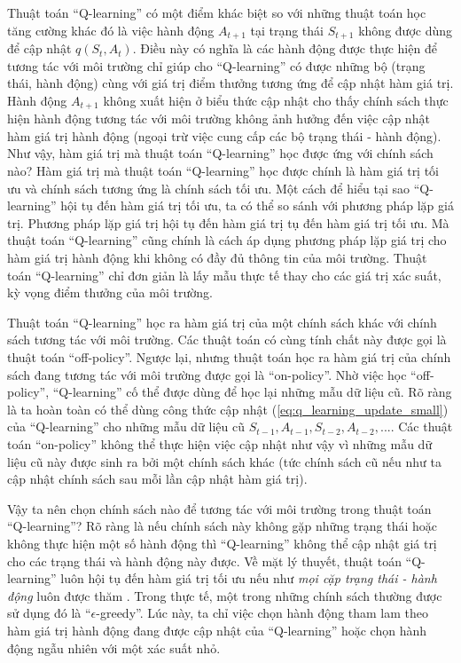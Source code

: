 Thuật toán ``Q-learning'' có một điểm khác biệt so với những thuật toán học tăng cường khác đó là việc hành động $A_{t+1}$ tại trạng thái $S_{t+1}$ không được dùng để cập nhật $q(S_t, A_t)$.
Điều này có nghĩa là các hành động được thực hiện để tương tác với môi trường chỉ giúp cho ``Q-learning'' có được những bộ (trạng thái, hành động) cùng với giá trị điểm thưởng tương ứng để cập nhật hàm giá trị.
Hành động $A_{t+1}$ không xuất hiện ở biểu thức cập nhật cho thấy chính sách thực hiện hành động tương tác với môi trường không ảnh hưởng đến việc cập nhật hàm giá trị hành động (ngoại trừ việc cung cấp các bộ trạng thái - hành động).
Như vậy, hàm giá trị mà thuật toán ``Q-learning'' học được ứng với chính sách nào?
Hàm giá trị mà thuật toán ``Q-learning'' học được chính là hàm giá trị tối ưu và chính sách tương ứng là chính sách tối ưu.
Một cách để hiểu tại sao ``Q-learning'' hội tụ đến hàm giá trị tối ưu, ta có thể so sánh với phương pháp lặp giá trị.
Phương pháp lặp giá trị hội tụ đến hàm giá trị tụ đến hàm giá trị tối ưu.
Mà thuật toán ``Q-learning'' cũng chính là cách áp dụng phương pháp lặp giá trị cho hàm giá trị hành động khi không có đầy đủ thông tin của môi trường.
Thuật toán ``Q-learning'' chỉ đơn giản là lấy mẫu thực tế thay cho các giá trị xác suất, kỳ vọng điểm thưởng của môi trường.

Thuật toán ``Q-learning'' học ra hàm giá trị của một chính sách khác với chính sách tương tác với môi trường.
Các thuật toán có cùng tính chất này được gọi là thuật toán ``off-policy''.
Ngược lại, nhưng thuật toán học ra hàm giá trị của chính sách đang tương tác với môi trường được gọi là ``on-policy''.
Nhờ việc học ``off-policy'', ``Q-learning'' cố thể được dùng để học lại những mẫu dữ liệu cũ.
Rõ ràng là ta hoàn toàn có thể dùng công thức cập nhật (\ref{eq:q_learning_update_small}) của ``Q-learning'' cho những mẫu dữ liệu cũ $S_{t-1}, A_{t-1}, S_{t-2}, A_{t-2}, ...$.
Các thuật toán ``on-policy'' không thể thực hiện việc cập nhật như vậy vì những mẫu dữ liệu cũ này được sinh ra bởi một chính sách khác (tức chính sách cũ nếu như ta cập nhật chính sách sau mỗi lần cập nhật hàm giá trị).

Vậy ta nên chọn chính sách nào để tương tác với môi trường trong thuật toán ``Q-learning''?
Rõ ràng là nếu chính sách này không gặp những trạng thái hoặc không thực hiện một số hành động thì ``Q-learning'' không thể cập nhật giá trị cho các trạng thái và hành động này được.
Về mặt lý thuyết, thuật toán ``Q-learning'' luôn hội tụ đến hàm giá trị tối ưu nếu như \textit{mọi cặp trạng thái - hành động} luôn được thăm \cite{sutton1998introduction}.
Trong thực tế, một trong những chính sách thường được sử dụng đó là ``$\epsilon$-greedy''.
Lúc này, ta chỉ việc chọn hành động tham lam theo hàm giá trị hành động đang được cập nhật của ``Q-learning'' hoặc chọn hành động ngẫu nhiên với một xác suất nhỏ.

